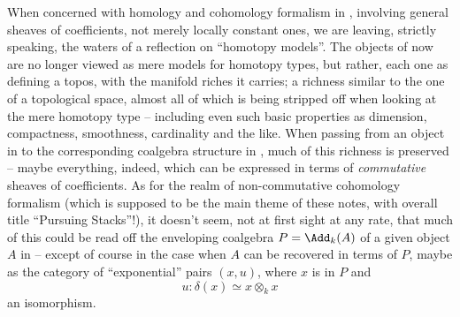 When concerned with homology and cohomology formalism in \Cat,
involving general sheaves of coefficients, not merely locally constant
ones, we are leaving, strictly speaking, the waters of a reflection on
``homotopy models''. The objects of \Cat{} now are no longer viewed as
mere models for homotopy types, but rather, each one as defining a
topos, with the manifold riches it carries; a richness similar to the
one of a topological space, almost all of which is being stripped off
when looking at the mere homotopy type -- including even such basic
properties as dimension, compactness, smoothness, cardinality and the
like. When passing from an object in \Cat{} to the corresponding
coalgebra structure in \Cat, much of this richness is preserved --
maybe everything, indeed, which can be expressed in terms of
\emph{commutative} sheaves of coefficients. As for the realm of
non-commutative cohomology formalism (which is supposed to be the main
theme of these notes, with overall title ``Pursuing Stacks''!), it
doesn't seem, not at first sight at any rate, that much of this could
be read off the enveloping coalgebra $P=\Add_k(A)$ of a given object
$A$ in \Cat{} -- except of course in the case when $A$ can be
recovered in terms of $P$, maybe as the category of ``exponential''
pairs $(x,u)$, where $x$ is in $P$ and
\[ u:\delta(x) \simeq x \otimes_k x\]
an isomorphism.

\bigbreak

\presectionfill{}\par


